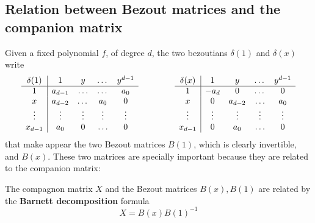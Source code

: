 \documentclass{standalone}
\begin{document}
\subsection{Relation between Bezout matrices and the companion matrix}
\label{Bar}
Given a fixed polynomial $f$, of degree $d$, the two bezoutians $\delta(1)$ and $\delta(x)$ write
\begin{equation}
	\begin{array}{c|cccc}
		\delta(1) & 1 & y & \dots & y^{d-1} \\
		\hline
		1 & a_{d-1} & \ldots & \dots & a_0 \\
		x & a_{d-2} & \dots & a_0 & 0 \\
		\vdots & \vdots & \vdots & \vdots & \vdots \\
		x_{d-1} & a_0 & 0 & \ldots & 0 \\
	\end{array}
	\hspace{1.5cm}
	\begin{array}{c|cccc}
		\delta(x) & 1 & y & \dots & y^{d-1} \\
		\hline
		1 & -a_{d} & 0 & \dots & 0 \\
		x & 0 & a_{d-2} & \ldots & a_0 \\
		\vdots & \vdots & \vdots & \vdots & \vdots \\
		x_{d-1} & 0 & a_0 & \ldots & 0 \\
	\end{array}
\end{equation}
that make appear the two Bezout matrices $B(1)$, which is clearly invertible, and $B(x)$. 
These two matrices are specially important because they are related to the companion matrix:
\begin{prop}
\label{Barnett}
The compagnon matrix $X$ and the Bezout matrices $B(x), B(1)$ are related by the {\bf Barnett decomposition} formula
\cite{Barnett}
\begin{equation}
	X = B(x)B(1)^{-1}
\end{equation}
\end{prop}
\end{document}
